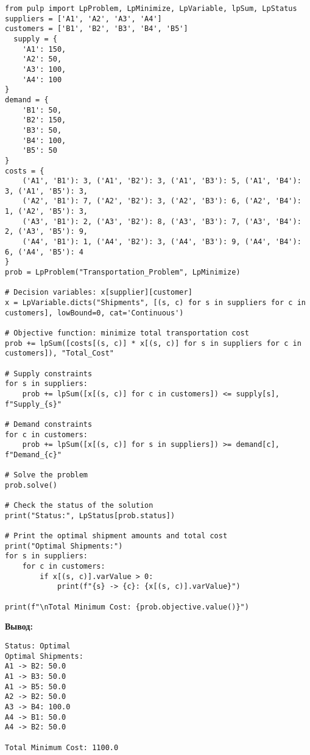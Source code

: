 \documentclass[17pt]{extarticle}
\begin{document}
\begin{verbatim}
from pulp import LpProblem, LpMinimize, LpVariable, lpSum, LpStatus    
suppliers = ['A1', 'A2', 'A3', 'A4']  
customers = ['B1', 'B2', 'B3', 'B4', 'B5']  
  supply = {  
    'A1': 150,  
    'A2': 50,  
    'A3': 100,  
    'A4': 100  
}    
demand = {  
    'B1': 50,  
    'B2': 150,  
    'B3': 50,  
    'B4': 100,  
    'B5': 50  
}    
costs = {  
    ('A1', 'B1'): 3, ('A1', 'B2'): 3, ('A1', 'B3'): 5, ('A1', 'B4'): 3, ('A1', 'B5'): 3,  
    ('A2', 'B1'): 7, ('A2', 'B2'): 3, ('A2', 'B3'): 6, ('A2', 'B4'): 1, ('A2', 'B5'): 3,  
    ('A3', 'B1'): 2, ('A3', 'B2'): 8, ('A3', 'B3'): 7, ('A3', 'B4'): 2, ('A3', 'B5'): 9,  
    ('A4', 'B1'): 1, ('A4', 'B2'): 3, ('A4', 'B3'): 9, ('A4', 'B4'): 6, ('A4', 'B5'): 4  
}  
prob = LpProblem("Transportation_Problem", LpMinimize)  
  
# Decision variables: x[supplier][customer]  
x = LpVariable.dicts("Shipments", [(s, c) for s in suppliers for c in customers], lowBound=0, cat='Continuous')  
  
# Objective function: minimize total transportation cost  
prob += lpSum([costs[(s, c)] * x[(s, c)] for s in suppliers for c in customers]), "Total_Cost"  
  
# Supply constraints  
for s in suppliers:  
    prob += lpSum([x[(s, c)] for c in customers]) <= supply[s], f"Supply_{s}"  
  
# Demand constraints  
for c in customers:  
    prob += lpSum([x[(s, c)] for s in suppliers]) >= demand[c], f"Demand_{c}"  
  
# Solve the problem  
prob.solve()  
  
# Check the status of the solution  
print("Status:", LpStatus[prob.status])  
  
# Print the optimal shipment amounts and total cost  
print("Optimal Shipments:")  
for s in suppliers:  
    for c in customers:  
        if x[(s, c)].varValue > 0:  
            print(f"{s} -> {c}: {x[(s, c)].varValue}")  
  
print(f"\nTotal Minimum Cost: {prob.objective.value()}")
\end{verbatim}

\textbf{Вывод:}
\begin{verbatim}
Status: Optimal
Optimal Shipments:
A1 -> B2: 50.0
A1 -> B3: 50.0
A1 -> B5: 50.0
A2 -> B2: 50.0
A3 -> B4: 100.0
A4 -> B1: 50.0
A4 -> B2: 50.0

Total Minimum Cost: 1100.0
\end{verbatim}
\end{document}
